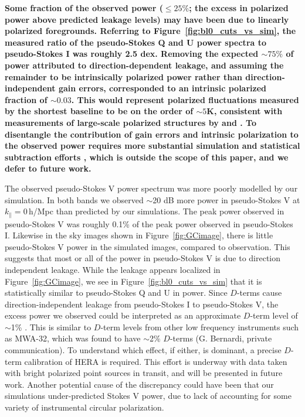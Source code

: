 \documentclass[twocolumn, trackchanges]{aastex61}
\newcommand{\edited}[1]{{\bf \color{red} #1}}
\begin{document}
\edited{Some fraction of the observed power ($\leqslant 25\%$; the excess in polarized power above predicted leakage levels) may have been due to linearly polarized foregrounds. Referring to Figure~\ref{fig:bl0_cuts_vs_sim}, the measured ratio of the pseudo-Stokes Q and U power spectra to pseudo-Stokes I was roughly 2.5 dex. Removing the expected $\sim75\%$ of power attributed to direction-dependent leakage, and assuming the remainder to be intrinsically polarized power rather than direction-independent gain errors, corresponded to an intrinsic polarized fraction of $\sim 0.03$. This would represent polarized fluctuations measured by the shortest baseline to be on the order of $\sim 5$K, consistent with measurements of large-scale polarized structures by \cite{Jelic.15} and \cite{Lenc.16}. To disentangle the contribution of gain errors and intrinsic polarization to the observed power requires more substantial simulation and statistical subtraction efforts \citep[e.g.][]{Lenc.18}, which is outside the scope of this paper, and we defer to future work.}

%


The observed pseudo-Stokes V power spectrum was more poorly modelled by our simulation. In both bands we observed $\sim$20 dB more power in pseudo-Stokes V at $k_{\parallel}=0$\,h/Mpc than predicted by our simulations. The peak power observed in pseudo-Stokes V was roughly 0.1\% of the peak power observed in pseudo-Stokes I. Likewise in the sky images shown in Figure~\ref{fig:GCimage}, there is little pseudo-Stokes V power in the simulated images, compared to observation. This suggests that most or all of the power in pseudo-Stokes V is due to direction independent leakage. While the leakage appears localized in Figure~\ref{fig:GCimage}, we see in Figure~\ref{fig:bl0_cuts_vs_sim} that it is statistically similar to pseudo-Stokes Q and U in power.
Since $D$-terms cause direction-independent leakage from pseudo-Stokes I to pseudo-Stokes V, the excess power we observed could be interpreted as an approximate $D$-term level of $\sim$1\% \citep{TMS}. This is similar to $D$-term levels from other low frequency instruments such as MWA-32, which was found to have $\sim$2\% $D$-terms (G. Bernardi, private communication).
To understand which effect, if either, is dominant, a precise $D$-term calibration of HERA is required. This effort is underway with data taken with bright polarized point sources in transit, and will be presented in future work. Another potential cause of the discrepancy could have been that our simulations under-predicted Stokes V power, due to lack of accounting for some variety of instrumental circular polarization.
\end{document}
